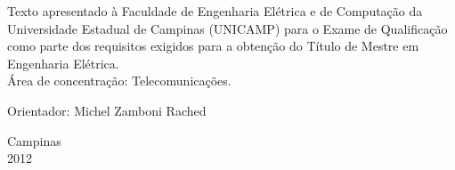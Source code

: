 \vspace*{3.0cm}

\begin{flushright}
\begin{minipage}{9.0cm}
Texto apresentado \`a Faculdade de Engenharia El\'etrica e de Computa\c{c}\~ao  da Universidade Estadual de Campinas (UNICAMP) para o Exame de Qualifica\c{c}\~ao como parte dos requisitos exigidos para a obten\c{c}\~ao do T\'itulo de Mestre em Engenharia El\'etrica.\\ \'Area de concentra\c{c}\~ao: Telecomunica\c{c}\~oes. 

\vspace*{0.5cm}
Orientador: Michel Zamboni Rached

\end{minipage}
\end{flushright}

\null \vfill

\vspace*{0.5cm}

\begin{center}
Campinas\\2012
\end{center}




